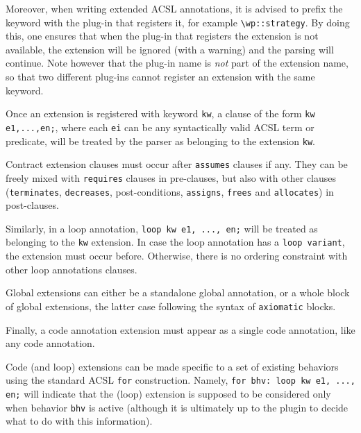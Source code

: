 Moreover, when writing extended ACSL annotations, it is advised to prefix the
keyword with the plug-in that registers it, for example
\lstinline{\wp::strategy}. By doing this, one ensures that when the plug-in that
registers the extension is not available, the extension will be ignored (with a
warning) and the parsing will continue. Note however that the plug-in name is
\emph{not} part of the extension name, so that two different plug-ins cannot
register an extension with the same keyword.

Once an extension is registered with keyword \lstinline|kw|,
a clause of the form \verb|kw e1,...,en;|,
where each \verb|ei| can be any syntactically valid ACSL term or predicate,
will be treated by the parser as belonging to the extension \verb|kw|.

Contract extension clauses must occur after \verb|assumes| clauses if any. They can be
freely mixed with \verb|requires| clauses in pre-clauses, but also with other
clauses (\verb|terminates|, \verb|decreases|, post-conditions, \verb|assigns|,
\verb|frees| and \verb|allocates|) in post-clauses.

Similarly, in a loop annotation, \verb|loop kw e1, ..., en;| will be treated as belonging to the
\verb|kw| extension. In case the loop annotation has a \verb|loop variant|, the extension must
occur before. Otherwise, there is no ordering constraint with other loop annotations clauses.

Global extensions can either be a standalone global annotation, or a whole block
of global extensions, the latter case following the syntax of
\texttt{axiomatic} blocks.

Finally, a code annotation extension must appear as a single code annotation, like any code annotation.

Code (and loop) extensions can be made specific to a
set of existing behaviors using the standard ACSL \verb|for| construction.
Namely, \verb|for bhv: loop kw e1, ..., en;| will indicate that the
(loop) extension is supposed to be considered only when behavior \verb|bhv| is
active (although it is ultimately up to the plugin to decide what to do with
this information).

